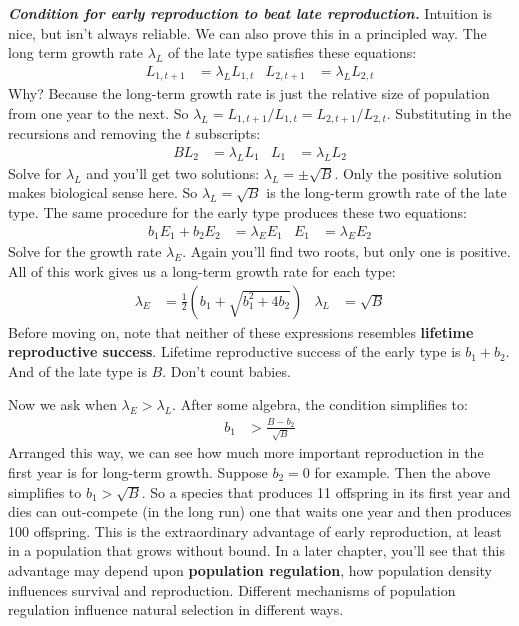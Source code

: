 \documentclass[10pt,reqno]{amsbook}
\newcommand{\bemph}[1]{{\textbf{\textcolor{bemphcol}{#1}}}}
\numberwithin{equation}{chapter}
\newenvironment{mathbox}[2]
{\begin{table}[#1]
\justify\begin{tcolorbox}[enhanced, oversize]\footnotesize\noindent\textbf{\emph{#2}}}
{\end{tcolorbox}\end{table}}
\begin{document}
\begin{mathbox}{p}{Condition for early reproduction to beat late reproduction.}
Intuition is nice, but isn't always reliable. We can also prove this in a principled way. The long term growth rate $\lambda_L$ of the late type satisfies these equations:
\begin{align*}
	L_{1,t+1}  &= \lambda_L L_{1,t} & L_{2,t+1} &= \lambda_L L_{2,t} 
\end{align*}
Why? Because the long-term growth rate is just the relative size of population from one year to the next. So $\lambda_L=L_{1,t+1}/L_{1,t}=L_{2,t+1}/L_{2,t}$. Substituting in the recursions and removing the $t$ subscripts:
\begin{align*}
	B L_2 &= \lambda_L L_{1}   &  L_1 &= \lambda_L L_2  
\end{align*}
Solve for $\lambda_L$ and you'll get two solutions: $\lambda_L = \pm \sqrt{B}$. Only the positive solution makes biological sense here. So $\lambda_L = \sqrt{B}$ is the long-term growth rate of the late type. The same procedure for the early type produces these two equations:
\begin{align*}
	b_1 E_1 + b_2 E_2 &= \lambda_E E_1 & 
	E_1 &= \lambda_E E_2
\end{align*}
Solve for the growth rate $\lambda_E$. Again you'll find two roots, but only one is positive. All of this work gives us a long-term growth rate for each type:
\begin{align*}
	\lambda_E &= \frac{1}{2} \! \left( b_1 + \sqrt{b_1^2 + 4 b_2} \right) &
	\lambda_L &= \sqrt{B}
\end{align*}
Before moving on, note that neither of these expressions resembles \bemph{lifetime reproductive success}. Lifetime reproductive success of the early type is $b_1 + b_2$. And of the late type is $B$. Don't count babies.

Now we ask when $\lambda_E > \lambda_L$. After some algebra, the condition simplifies to:
\begin{align*}
	b_1 &> \frac{B - b_2}{\sqrt{B}}
\end{align*}
Arranged this way, we can see how much more important reproduction in the first year is for long-term growth. Suppose $b_2=0$ for example. Then the above simplifies to $b_1 > \sqrt{B}$. So a species that produces 11 offspring in its first year and dies can out-compete (in the long run) one that waits one year and then produces 100 offspring. This is the extraordinary advantage of early reproduction, at least in a population that grows without bound. In a later chapter, you'll see that this advantage may depend upon \bemph{population regulation}, how population density influences survival and reproduction. Different mechanisms of population regulation influence natural selection in different ways.
\end{mathbox}
\end{document}
